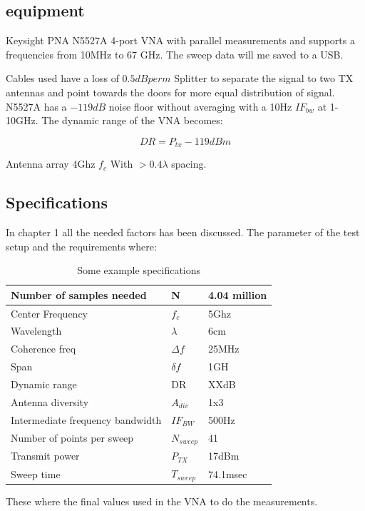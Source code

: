 \subsection{equipment}
\label{equip}
Keysight PNA N5527A 4-port VNA with parallel measurements and supports a frequencies from 10MHz to 67 GHz. The sweep data will me saved to a USB.

Cables used have a loss of $0.5dB per m$ 
Splitter to separate the signal to two TX antennas and point towards the doors for more equal distribution of signal.
N5527A has a $-119dB$ noise floor without averaging with a 10Hz $IF_{bw}$ at 1-10GHz. The dynamic range of the VNA becomes:

\begin{equation}
DR = P_{tx}-119dBm 
\label{NFvna}
\end{equation}

Antenna array 4Ghz $f_c$ With $>0.4 \lambda$ spacing.

\subsection{Specifications}
In chapter 1 all the needed factors has been discussed. The parameter of the test setup and the requirements where:
\begin{table}[H]
\centering
\caption{Some example specifications}
\label{final_specs}
\begin{tabular}{|l|l|l|}
\hline
Number of samples needed         & N           & 4.04 million         \\ \hline
Center Frequency                 & $f_c$       & 5Ghz             \\ \hline
Wavelength                       & $\lambda$   & 6cm           \\ \hline
Coherence freq                   & $\Delta f$  & 25MHz           \\ \hline
Span & $\delta f$ & 1GH \\ \hline
Dynamic range                    & DR          & XXdB            \\ \hline
Antenna diversity                & $A_{div}$   & 1x3                    \\ \hline
Intermediate frequency bandwidth & $IF_{BW}$     & 500Hz          \\ \hline
Number of points per sweep & $N_{sweep}$ & 41 \\ \hline
Transmit power & $P_{TX}$ & 17dBm \\ \hline
Sweep time & $T_{sweep}$ &74.1msec \\ \hline
\end{tabular}
\end{table}
These where the final values used in the VNA to do the measurements.
